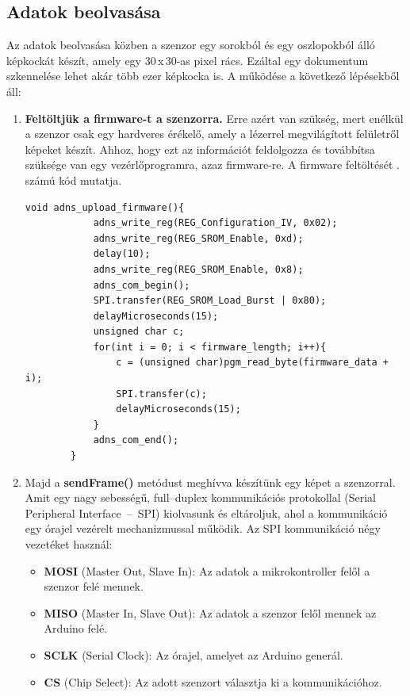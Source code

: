 \documentclass[]{thesis-ekf}
\theoremstyle{definition}
\theoremstyle{remark}
\begin{document}
\subsection{Adatok beolvasása}
Az adatok beolvasása közben a szenzor egy sorokból és egy oszlopokból álló képkockát készít, amely egy 30\,x\,30-as pixel rács. Ezáltal egy dokumentum szkennelése lehet akár több ezer képkocka is.
A működése a következő lépésekből áll:
\begin{enumerate}
	\item \textbf{Feltöltjük a firmware-t a szenzorra.} Erre azért van szükség, mert enélkül a szenzor csak egy hardveres érékelő, amely a lézerrel megvilágított felületről képeket készít. Ahhoz, hogy ezt az információt feldolgozza és továbbítsa szüksége van egy vezérlőprogramra, azaz firmware-re. A firmware feltöltését . számú kód mutatja.
	\begin{lstlisting}[language=Arduino,label=upload-firmware-code,caption=Firmware feltöltése]
		void adns_upload_firmware(){
			adns_write_reg(REG_Configuration_IV, 0x02);	
			adns_write_reg(REG_SROM_Enable, 0xd); 
			delay(10); 
			adns_write_reg(REG_SROM_Enable, 0x8); 
			adns_com_begin();
			SPI.transfer(REG_SROM_Load_Burst | 0x80); 
			delayMicroseconds(15);
			unsigned char c;
			for(int i = 0; i < firmware_length; i++){ 
				c = (unsigned char)pgm_read_byte(firmware_data + i);
				SPI.transfer(c);
				delayMicroseconds(15); 
			}
			adns_com_end();
		}
	\end{lstlisting}
	\item Majd a \textbf{sendFrame()} metódust meghívva készítünk egy képet a szenzorral. Amit egy nagy sebességű, full--duplex kommunikációs protokollal (Serial Peripheral Interface~--~SPI) kiolvasunk és eltároljuk, ahol a kommunikáció egy órajel vezérelt mechanizmussal működik. Az SPI kommunikáció négy vezetéket használ: 
	\begin{itemize}
		\item \textbf{MOSI }(Master Out, Slave In): Az adatok a mikrokontroller felől a szenzor felé mennek.
		\item \textbf{MISO }(Master In, Slave Out): Az adatok a szenzor felől mennek az Arduino felé.
		\item \textbf{SCLK }(Serial Clock): Az órajel, amelyet az Arduino generál.
		\item \textbf{CS }(Chip Select): Az adott szenzort választja ki a kommunikációhoz.
	\end{itemize}
	\footnotesize{
	\begin{lstlisting}[language=Arduino,label=sendFrame,caption=sendFrame metódus]

\end{lstlisting}}
\end{enumerate}
\end{document}
